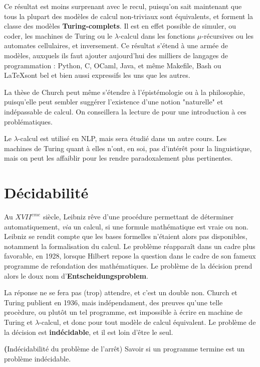 Ce résultat est moins surprenant avec le recul, puisqu'on sait maintenant que tous la plupart des modèles de calcul non-triviaux sont équivalents, et forment la classe des modèles \textbf{Turing-complets}. Il est en effet possible de simuler, ou coder, les machines de Turing ou le $\lambda$-calcul dans les fonctions $\mu$-récursives ou les automates cellulaires, et inversement. Ce résultat s'étend à une armée de modèles, auxquels ils faut ajouter aujourd'hui des milliers de langages de programmation : Python, C, OCaml, Java, et même Makefile, Bash ou \LaTeX sont bel et bien aussi expressifs les uns que les autres.

La thèse de Church peut même s'étendre à l'épistémologie ou à la philosophie, puisqu'elle peut sembler suggérer l'existence d'une notion "naturelle" et indépassable de calcul. On conseillera la lecture de \cite{dowek} pour une introduction à ces problématiques.


Le $\lambda$-calcul est utilisé en NLP, mais sera étudié dans un autre cours. Les machines de Turing quant à elles n'ont, en soi, pas d'intérêt pour la linguistique, mais on peut les affaiblir pour les rendre paradoxalement plus pertinentes.

\section{Décidabilité}

Au $XVII^{eme}$ siècle, Leibniz rêve d'une procédure permettant de déterminer automatiquement, \textit{via} un calcul, si une formule mathématique est vraie ou non. Leibniz se rendit compte que les bases formelles n'étaient alors pas disponibles, notamment la formalisation du calcul. Le problème réapparaît dans un cadre plus favorable, en 1928, lorsque Hilbert repose la question dans le cadre de son fameux programme de refondation des mathématiques. Le problème de la décision prend alors le doux nom d'\textbf{Entscheidungsproblem}. 

La réponse ne se fera pas (trop) attendre, et c'est un double non. Church et Turing publient en 1936, mais indépendament, des preuves qu'une telle procèdure, ou plutôt un tel programme, est impossible à écrire en machine de Turing et $\lambda$-calcul, et donc pour tout modèle de calcul équivalent. Le problème de la décision est \textbf{indécidable}, et il est loin d'être le seul.

\begin{theorem}{\textbf(Indécidabilité du problème de l'arrêt)} Savoir si un programme termine est un problème indécidable.
\end{theorem}

